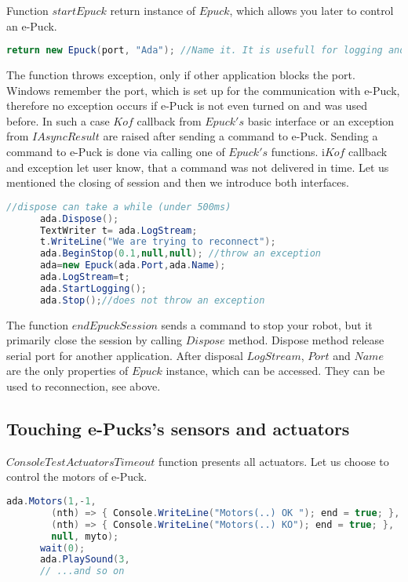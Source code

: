 	Function $startEpuck$ return instance of $Epuck$, which allows you later to control an e-Puck.
\begin{lstlisting}[language=cs]
      return new Epuck(port, "Ada"); //Name it. It is usefull for logging and debugging.
\end{lstlisting}
	The function throws exception, only if other application blocks the port. Windows remember
	the port, which is set up for the communication with e-Puck, therefore
	no exception occurs if e-Puck is not even turned on and was used before.
	In such a case $Kof$ callback from $Epuck's$ basic interface or an exception	
	from $IAsyncResult$ are raised after sending a command to e-Puck.
	Sending a command to e-Puck is done via calling one of $Epuck's$ functions.
	i$Kof$ callback and exception let user know, that a command was not delivered in time.
	Let us mentioned the closing of session and then we introduce both interfaces.
\begin{lstlisting}[language=cs]
      //dispose can take a while (under 500ms)
      ada.Dispose();
      TextWriter t= ada.LogStream;
      t.WriteLine("We are trying to reconnect");
      ada.BeginStop(0.1,null,null); //throw an exception
      ada=new Epuck(ada.Port,ada.Name);
      ada.LogStream=t;
      ada.StartLogging();
      ada.Stop();//does not throw an exception
\end{lstlisting}
	The function $endEpuckSession$ sends a command to stop your robot, but it primarily close the session by calling $Dispose$ method.
	Dispose method release serial port for another application. After disposal $LogStream$, $Port$ and $Name$ are the 
	only properties of $Epuck$ instance, which can be accessed. They can be used to reconnection, see above.

\subsection{Touching e-Pucks's sensors and actuators}\label{sec:touching}
	$ConsoleTestActuatorsTimeout$ function presents all actuators. Let us choose to control the motors of e-Puck.
\begin{lstlisting}[language=cs]
      ada.Motors(1,-1,
        (nth) => { Console.WriteLine("Motors(..) OK "); end = true; },
        (nth) => { Console.WriteLine("Motors(..) KO"); end = true; },
        null, myto);
      wait(0);
      ada.PlaySound(3,
      // ...and so on
\end{lstlisting}
	
